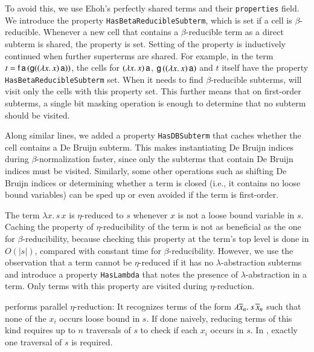 To avoid this, we use Ehoh's perfectly shared
terms and their \texttt{properties} field.
%
We introduce the property \texttt{HasBetaReducibleSubterm}, which is set if
a cell is $\beta$-reducible.
Whenever a new cell that contains a
$\beta$-reducible term as a direct subterm is shared, the property is set.
Setting of the property is inductively continued when further superterms are
shared. For example, in the term $t = \mathsf{f} \, \mathsf{a} \, (\mathsf{g} ((\lambda x.\,
x)\,\mathsf{a}))$, the cells for $(\lambda x.\, x)\,\mathsf{a}$,
$\mathsf{g}\,((\lambda x.\, x)\,\mathsf{a})$ and $t$ itself have the property
\texttt{HasBetaReducibleSubterm} set.
%
When it needs to find $\beta$-reducible subterms, \ehohii{} will visit only the
cells with this property set. This further means that on first-order
subterms, a single bit masking operation is enough to determine that no subterm
should be visited.

Along similar lines, we added a property \texttt{HasDBSubterm} that
caches whether the cell contains a De Bruijn subterm. This
makes
instantiating De Bruijn indices during $\beta$-norma\-lization faster, since only the
subterms that contain De Bruijn indices must be visited. Similarly, some other
operations such as shifting De Bruijn indices or determining whether a term is closed
(i.e., it contains no loose bound variables) can be sped up or even avoided
if the term is first-order.

The term $\lambda x.\, s \, x$ is $\eta$-reduced to $s$ whenever $x$ is not a loose bound variable
in $s$. Caching the property of $\eta$-reducibility of the term is not
as beneficial as the one for $\beta$-reducibility, because checking this
property at the term's top level is done in $O(|s|)$, compared with constant time
for $\beta$-reducibility.
However, we use the observation that a term cannot be $\eta$-reduced if it has
no $\lambda$-abstraction subterms and introduce a property \texttt{HasLambda}
that notes the presence of $\lambda$-abstraction in a term. Only
terms with this property are visited during $\eta$-reduction.

\ehohii{} performs parallel $\eta$-reduction: It recognizes terms of the form
$\lambda \overline{x}_n.\> s \, \overline{x}_n  $ such that none of the $x_i$
occurs loose bound in $s$. If done naively, reducing terms of this kind requires up to $n$
traversals of $s$ to check if each $x_i$ occurs in $s$. In \ehohii{}, exactly one
traversal of $s$ is required.

